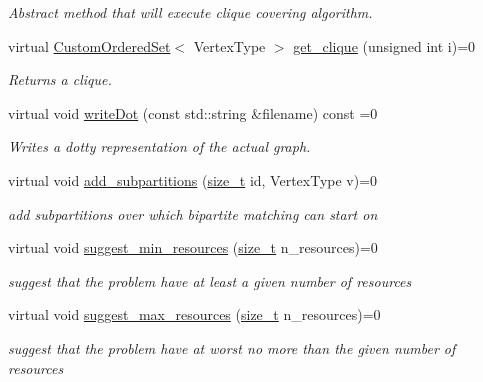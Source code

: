 \begin{DoxyCompactItemize}
\begin{DoxyCompactList}\small\item\em Abstract method that will execute clique covering algorithm. \end{DoxyCompactList}\item 
virtual \hyperlink{classCustomOrderedSet}{Custom\+Ordered\+Set}$<$ Vertex\+Type $>$ \hyperlink{classclique__covering_ab0ac09e6c1be800358fb327728a07146}{get\+\_\+clique} (unsigned int i)=0
\begin{DoxyCompactList}\small\item\em Returns a clique. \end{DoxyCompactList}\item 
virtual void \hyperlink{classclique__covering_a67c99c3f13f8a9400ae6e83d8bd31ba5}{write\+Dot} (const std\+::string \&filename) const =0
\begin{DoxyCompactList}\small\item\em Writes a dotty representation of the actual graph. \end{DoxyCompactList}\item 
virtual void \hyperlink{classclique__covering_a5d40053f9ab862b4db09ec41964e0617}{add\+\_\+subpartitions} (\hyperlink{tutorial__fpt__2017_2intro_2sixth_2test_8c_a7c94ea6f8948649f8d181ae55911eeaf}{size\+\_\+t} id, Vertex\+Type v)=0
\begin{DoxyCompactList}\small\item\em add subpartitions over which bipartite matching can start on \end{DoxyCompactList}\item 
virtual void \hyperlink{classclique__covering_aaf503ea280de45beb314149704414922}{suggest\+\_\+min\+\_\+resources} (\hyperlink{tutorial__fpt__2017_2intro_2sixth_2test_8c_a7c94ea6f8948649f8d181ae55911eeaf}{size\+\_\+t} n\+\_\+resources)=0
\begin{DoxyCompactList}\small\item\em suggest that the problem have at least a given number of resources \end{DoxyCompactList}\item 
virtual void \hyperlink{classclique__covering_a77494360834560870073884abd37883b}{suggest\+\_\+max\+\_\+resources} (\hyperlink{tutorial__fpt__2017_2intro_2sixth_2test_8c_a7c94ea6f8948649f8d181ae55911eeaf}{size\+\_\+t} n\+\_\+resources)=0
\begin{DoxyCompactList}\small\item\em suggest that the problem have at worst no more than the given number of resources \end{DoxyCompactList}\item 

\end{DoxyCompactItemize}
